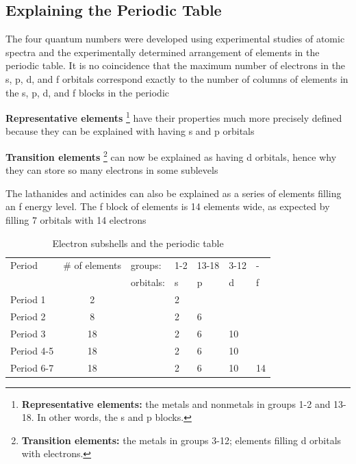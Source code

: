 \subsection{Explaining the Periodic Table}
\begin{bulleted-list}
    \item The four quantum numbers were developed using experimental studies of atomic spectra
        and the experimentally determined arrangement of elements in the periodic table. It is no
        coincidence that the maximum number of electrons in the s, p, d, and f orbitals correspond
        exactly to the number of columns of elements in the s, p, d, and f blocks in the periodic
    \item \textbf{Representative elements}
        \footnote{
            \textbf{Representative elements:} the metals and nonmetals in groups 1-2 and 13-18.
            In other words, the s and p blocks.
        }
        have their properties much more precisely defined because
        they can be explained with having s and p orbitals
    \item \textbf{Transition elements}
        \footnote{
            \textbf{Transition elements:} the metals in groups 3-12; elements filling d orbitals with
            electrons.
        }
        can now be explained as having d orbitals, hence why they
        can store so many electrons in some sublevels
    \item The lathanides and actinides can also be explained as a series of elements filling an f
        energy level. The f block of elements is 14 elements wide, as expected by filling 7 orbitals
        with 14 electrons
\end{bulleted-list}

\begin{table}[!ht]
    \centering
    \caption{Electron subshells and the periodic table}
    \begin{tabular}{|l|c|l l l l l|}
        \hline
        \rowcolor{HeaderColor}
        Period & \# of elements & groups: & 1-2 & 13-18 & 3-12 & - \\
        \rowcolor{HeaderColor}
               & & orbitals: & s & p & d & f \\ \hline
        Period 1 & 2 & & 2 & & & \\ \hline
        Period 2 & 8 & & 2 & 6 & & \\ \hline
        Period 3 & 18 & & 2 & 6 & 10 & \\ \hline
        Period 4-5 & 18 & & 2 & 6 & 10 & \\ \hline
        Period 6-7 & 18 & & 2 & 6 & 10 & 14 \\ \hline
    \end{tabular}
\end{table}


